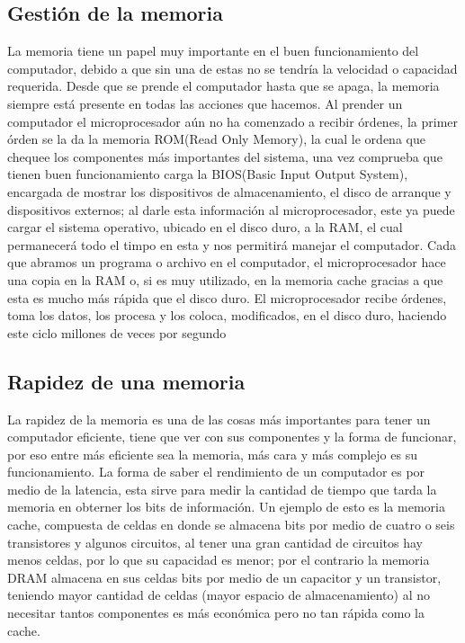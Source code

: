 \documentclass{article}
\begin{document}
\subsection{Gestión de la memoria}
La memoria tiene un papel muy importante en el buen funcionamiento del computador, debido a que sin una de estas no se tendría la velocidad o capacidad requerida. Desde que se prende el computador hasta que se apaga, la memoria siempre está presente en todas las acciones que hacemos. Al prender un computador el microprocesador aún no ha comenzado a recibir órdenes, la primer órden se la da la memoria ROM(Read Only Memory), la cual le ordena que chequee los componentes más importantes del sistema, una vez comprueba que tienen buen funcionamiento carga la BIOS(Basic Input Output System), encargada de mostrar los dispositivos de almacenamiento, el disco de arranque y dispositivos externos; al darle esta información al microprocesador, este ya puede cargar el sistema operativo, ubicado en el disco duro, a la RAM, el cual permanecerá todo el timpo en esta y nos permitirá manejar el computador. Cada que abramos un programa o archivo en el computador, el microprocesador hace una copia en la RAM o, si es muy utilizado, en la memoria cache gracias a que esta es mucho más rápida que el disco duro. El microprocesador recibe órdenes, toma los datos, los procesa y los coloca, modificados, en el disco duro, haciendo este ciclo millones de veces por segundo

\subsection{Rapidez de una memoria}
La rapidez de la memoria es una de las cosas más importantes para tener un computador eficiente, tiene que ver con sus componentes y la forma de funcionar, por eso entre más eficiente sea la memoria, más cara y más complejo es su funcionamiento. La forma de saber el rendimiento de un computador es por medio de la latencia, esta sirve para medir la cantidad de tiempo que tarda la memoria en obterner los bits de información. Un ejemplo de esto es la memoria cache, compuesta de celdas en donde se almacena bits por medio de cuatro o seis transistores y algunos circuitos, al tener una gran cantidad de circuitos hay menos celdas, por lo que su capacidad es menor; por el contrario la memoria DRAM almacena en sus celdas bits por medio de un capacitor y un transistor, teniendo mayor cantidad de celdas (mayor espacio de almacenamiento) al no necesitar tantos componentes es más económica pero no tan rápida como la cache.
\end{document}
